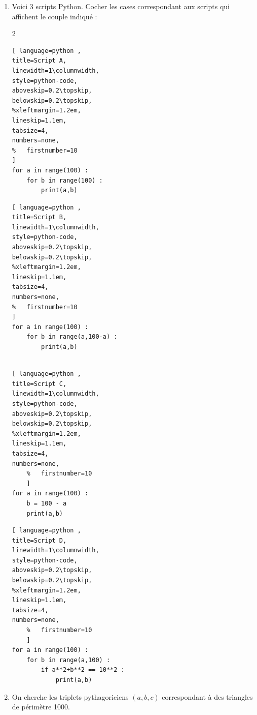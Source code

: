  \newpage  
\begin{exercise}\label{chapitre05:exercice:tripletspythagoriciensAlgorithme}\hfill 
	
	\begin{enumerate}[label=\arabic*),leftmargin=*]
		\item Voici 3 scripts Python. Cocher les cases correspondant aux scripts qui affichent le couple indiqué :
		\begin{multicols}{2} \setlength\columnseprule{.0pt}
\begin{lstlisting}[ language=python , 
title=Script A,   
linewidth=1\columnwidth,
style=python-code,    
aboveskip=0.2\topskip,
belowskip=0.2\topskip,
%xleftmargin=1.2em,
lineskip=1.1em,
tabsize=4, 
numbers=none,
%	firstnumber=10  
]
for a in range(100) :
	for b in range(100) :
		print(a,b) 
\end{lstlisting}  
\begin{lstlisting}[ language=python , 
title=Script B,   
linewidth=1\columnwidth,
style=python-code,    
aboveskip=0.2\topskip,
belowskip=0.2\topskip,
%xleftmargin=1.2em,
lineskip=1.1em,
tabsize=4, 
numbers=none,
%	firstnumber=10  
] 
for a in range(100) :
	for b in range(a,100-a) :
		print(a,b) 
		
\end{lstlisting} 

\begin{lstlisting}[ language=python , 
title=Script C,   
linewidth=1\columnwidth,
style=python-code,    
aboveskip=0.2\topskip,
belowskip=0.2\topskip,
%xleftmargin=1.2em,
lineskip=1.1em,
tabsize=4, 
numbers=none,
	%	firstnumber=10  
	] 
for a in range(100) :
	b = 100 - a
	print(a,b)
\end{lstlisting}
\begin{lstlisting}[ language=python , 
title=Script D,   
linewidth=1\columnwidth,
style=python-code,    
aboveskip=0.2\topskip,
belowskip=0.2\topskip,
%xleftmargin=1.2em,
lineskip=1.1em,
tabsize=4, 
numbers=none,
	%	firstnumber=10  
	] 
for a in range(100) :
	for b in range(a,100) :
		if a**2+b**2 == 10**2 :
			print(a,b)  
\end{lstlisting}
		\end{multicols}
			 
\noindent {} 
\vfill 
		\item On cherche les triplets pythagoriciens $(a,b,c)$ correspondant à des triangles de périmètre 1000.
 

\end{enumerate}
\end{exercise}
